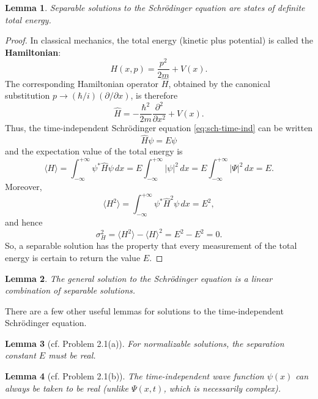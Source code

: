 \documentclass{article}
\newtheorem*{lemma*}{Lemma}
\begin{document}
\begin{lemma*}
  Separable solutions to the Schr\"{o}dinger equation are states of
  \emph{definite total energy}.
\end{lemma*}
\begin{proof}
  In classical mechanics, the total energy (kinetic plus potential) is called
  the \textbf{Hamiltonian}: \[
    H(x, p) = \frac{p^2}{2m} + V(x).
  \] The corresponding Hamiltonian operator $\hat{H}$, obtained by the
  canonical substitution $p \rightarrow (\hbar/i)(\partial/\partial x)$, is
  therefore
  \begin{equation} \label{eq:ham-op}
    \hat{H} = -\frac{\hbar^2}{2m} \frac{\partial^2}{\partial x^2} + V(x).
  \end{equation}
  Thus, the time-independent Schr\"{o}dinger equation \eqref{eq:sch-time-ind}
  can be written
  \begin{equation} \label{eq:sch-time-ind-ham}
    \hat{H}\psi = E\psi
  \end{equation}
  and the expectation value of the total energy is \[
    \langle H \rangle
    = \int_{-\infty}^{+\infty} \psi^* \hat{H} \psi \,dx
    = E\int_{-\infty}^{+\infty} |\psi|^2 \,dx
    = E\int_{-\infty}^{+\infty} |\Psi|^2 \,dx
    = E.
    \] Moreover, \[
  \langle H^2 \rangle
    = \int_{-\infty}^{+\infty} \psi^* \hat{H}^2 \psi \,dx
    = E^2,
  \] and hence \[
    \sigma_H^2 = \langle H^2 \rangle - \langle H \rangle^2 = E^2 - E^2 = 0.
  \] So, a separable solution has the property that every measurement of the
  total energy is certain to return the value $E$.
\end{proof}

\begin{lemma*}
  The general solution to the Schr\"{o}dinger equation is a \emph{linear
  combination} of separable solutions.
\end{lemma*}

There are a few other useful lemmas for solutions to the time-independent
Schr\"{o}dinger equation.

\begin{lemma*}[cf. Problem 2.1(a)]
  For normalizable solutions, the separation constant $E$ must be real.
\end{lemma*}

\begin{lemma*}[cf. Problem 2.1(b)]
  The time-independent wave function $\psi(x)$ can always be taken to be real
  (unlike $\Psi(x, t)$, which is necessarily complex).
\end{lemma*}
\end{document}
